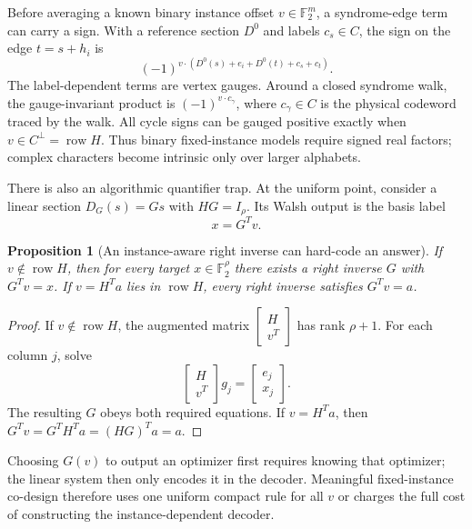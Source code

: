 \documentclass[journal]{IEEEtran}
\newtheorem{proposition}[theorem]{Proposition}
\theoremstyle{definition}
\theoremstyle{remark}
\newcommand{\F}{\mathbb F}
\begin{document}
Before averaging a known binary instance offset $v\in\F_2^m$, a syndrome-edge
term can carry a sign.  With a reference section $D^0$ and labels $c_s\in C$,
the sign on the edge $t=s+h_i$ is
\begin{equation}
 (-1)^{v\cdot(D^0(s)+e_i+D^0(t)+c_s+c_t)}.
 \label{eq:fixed-sign}
\end{equation}
The label-dependent terms are vertex gauges.  Around a closed syndrome walk,
the gauge-invariant product is $(-1)^{v\cdot c_\gamma}$, where
$c_\gamma\in C$ is the physical codeword traced by the walk.  All cycle signs
can be gauged positive exactly when $v\in C^\perp=\operatorname{row}H$.
Thus binary fixed-instance models require signed real factors; complex
characters become intrinsic only over larger alphabets.

There is also an algorithmic quantifier trap.  At the uniform point, consider
a linear section $D_G(s)=Gs$ with $HG=I_\rho$.  Its Walsh output is the basis
label
\begin{equation}
 x=G^Tv.
 \label{eq:right-inverse-output}
\end{equation}

\begin{proposition}[An instance-aware right inverse can hard-code an answer]
\label{prop:no-free-lunch}
If $v\notin\operatorname{row}H$, then for every target $x\in\F_2^\rho$ there
exists a right inverse $G$ with $G^Tv=x$.  If $v=H^Ta$ lies in
$\operatorname{row}H$, every right inverse satisfies $G^Tv=a$.
\end{proposition}

\begin{proof}
If $v\notin\operatorname{row}H$, the augmented matrix
$\left[\begin{smallmatrix}H\\v^T\end{smallmatrix}\right]$ has rank $\rho+1$.
For each column $j$, solve
\begin{equation}
 \begin{bmatrix}H\\v^T\end{bmatrix}g_j
 =\begin{bmatrix}e_j\\x_j\end{bmatrix}.
\end{equation}
The resulting $G$ obeys both required equations.  If $v=H^Ta$, then
$G^Tv=G^TH^Ta=(HG)^Ta=a$.
\end{proof}

Choosing $G(v)$ to output an optimizer first requires knowing that optimizer;
the linear system then only encodes it in the decoder.  Meaningful
fixed-instance co-design therefore uses one uniform compact rule for all $v$
or charges the full cost of constructing the instance-dependent decoder.
\end{document}
